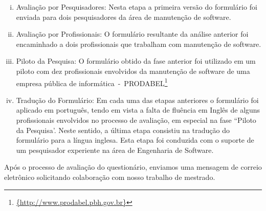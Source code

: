 \begin{enumerate}[(i)]
	\item Avaliação por Pesquisadores: Nesta etapa a primeira versão do
		formulário foi enviada para dois pesquisadores da área de manutenção de
		software.
	\item Avaliação por Profissionais: O formulário resultante da análise
		anterior foi encaminhado a dois profissionais que trabalham com
		manutenção de software.
	\item Piloto da Pesquisa: O formulário obtido da fase anterior foi utilizado
		em um piloto com dez profissionais envolvidos da manutenção de software
		de uma empresa pública de
		informática~-~PRODABEL\footnote{\url{{http://www.prodabel.pbh.gov.br}}}
	\item Tradução do Formulário: Em cada uma das etapas anteriores o
		formulário foi aplicado em português, tendo em vista a falta de fluência
		em Inglês de alguns profissionais envolvidos no processo de avaliação,
		em especial na fase ``Piloto da Pesquisa'. Neste sentido, a última etapa
		consistiu na tradução do formulário para a língua inglesa. Esta etapa
		foi conduzida com  o suporte de um pesquisador experiente na área de
		Engenharia de Software.
\end{enumerate}

Após o processo de avaliação do questionário, enviamos uma mensagem de correio
eletrônico solicitando colaboração com nosso trabalho de mestrado.




